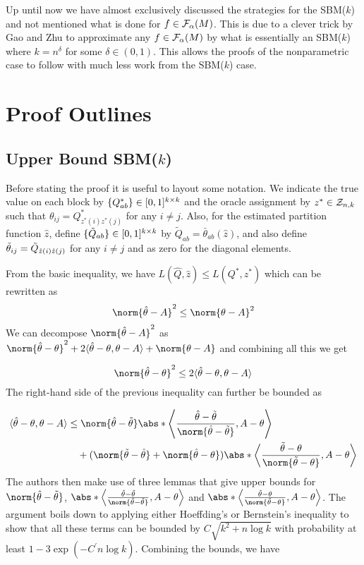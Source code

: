 \documentclass[11pt]{article}
\begin{document}
Up until now we have almost exclusively discussed the strategies for the SBM($k$) and not mentioned what is done for $f \in \mathcal{F}_{\alpha}(M)$. This is due to a clever trick by Gao and Zhu to approximate any $f \in \mathcal{F}_{\alpha}(M)$ by what is essentially an SBM($k$) where $k = n^{\delta}$ for some $\delta \in (0, 1)$. This allows the proofs of the nonparametric case to follow with much less work from the SBM($k$) case.

\section{Proof Outlines}\label{sec:proofs}

\subsection{Upper Bound SBM($k$)} \label{sec:upper_sbm}

Before stating the proof it is useful to layout some notation. We indicate the true value on each block by $\{Q^\ast_{ab}\} \in \lbrack0,1\rbrack^{k \times k}$ and the oracle assignment by $z^\ast \in \mathcal{Z}_{n,k}$ such that $\theta_{ij} = Q^\ast_{z^\ast(i)z^\ast(j)}$ for any $i\neq j$. Also, for the estimated partition function $\hat{z}$, define $\{\tilde{Q}_{ab}\} \in \lbrack0,1\rbrack^{k \times k}$  by $\tilde{Q}_{ab} = \bar{\theta}_{ab}(\hat{z})$, and also define $\Tilde{\theta}_{ij}=\tilde{Q}_{\hat{z}(i)\hat{z}(j)}$ for any $i \neq j$ and as zero for the diagonal elements.

From the basic inequality, we have $L(\hat{Q},\hat{z}) \leq L(Q^\ast, z^\ast)$ which can be rewritten as
\[
\norm{\htheta - A}^2 \leq \norm{\theta - A}^2
\]
We can decompose $\norm{\htheta - A}^2$ as $\norm{\htheta - \theta}^2 + 2\dprod{\htheta - \theta, \theta - A} + \norm{\theta - A}$ and combining all this we get

\[
\norm{\htheta - \theta}^2 \leq 2\dprod{\htheta - \theta, \theta - A}
\]
The right-hand side of the previous inequality can further be bounded as

\begin{align*}
    \dprod{\htheta - \theta, \theta - A} & \leq \norm{\htheta - \ttheta}\abs*{\dprod*{\frac{\htheta-\ttheta}{\norm{\htheta - \ttheta}}, A - \theta  }} \\
  & \quad + (\norm{\ttheta - \htheta} + \norm{\htheta - \theta})\abs*{\dprod*{\frac{\ttheta-\theta}{\norm{\ttheta-\theta}},A-\theta}}
\end{align*}
The authors then make use of three lemmas that give upper bounds for $\norm{\htheta-\ttheta}$, $\abs*{\dprod*{\frac{\ttheta-\ttheta}{\norm{\ttheta-\ttheta}},A-\theta}}$ and $\abs*{\dprod*{\frac{\ttheta-\theta}{\norm{\ttheta-\theta}},A-\theta}}$. The argument boils down to applying either Hoeffding's or Bernstein's inequality to show that all these terms can be bounded by $C\sqrt{k^2 +n\log k}$ with probability at least $1-3\exp(-C^\prime n\log k)$. Combining the bounds, we have
\end{document}
